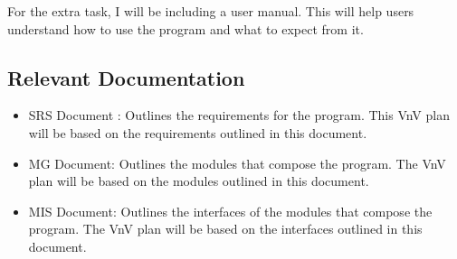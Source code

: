 \documentclass[12pt, titlepage]{article}
\begin{document}
For the extra task, I will be including a user manual. This will help users
understand how to use the program and what to expect from it.



\subsection{Relevant Documentation}


  \begin{itemize}
    \item SRS Document \cite{SRS}: Outlines the requirements for the \progname{}
    program. This VnV plan will be based on the requirements outlined in this
    document.
    \item MG Document: Outlines the modules that compose the \progname{} program.
    The VnV plan will be based on the modules outlined in this document.
    \item MIS Document: Outlines the interfaces of the modules that compose the
    \progname{} program. The VnV plan will be based on the interfaces outlined in
    this document.
  \end{itemize}
\end{document}
